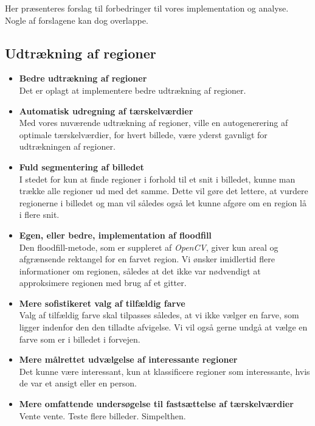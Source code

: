 {
{\sffamily Her præsenteres forslag til forbedringer til vores
implementation og analyse. Nogle af forslagene kan dog overlappe.
}

\subsection{Udtrækning af regioner}
\begin{itemize}
     \item \textbf{Bedre udtrækning af regioner}\\
        Det er oplagt at implementere bedre udtrækning af regioner.
     \item \textbf{Automatisk udregning af tærskelværdier}\\
        Med vores nuværende udtrækning af regioner, ville en
        autogenerering af optimale tærskelværdier, for hvert billede,
        være yderst gavnligt for udtrækningen af regioner.
    \item \textbf{Fuld segmentering af billedet}\\
        I stedet for kun at finde regioner i forhold til et snit i
        billedet, kunne man trække alle regioner ud med det samme. Dette
        vil gøre det lettere, at vurdere regionerne i billedet og man
        vil således også let kunne afgøre om en region lå i flere snit.
  \item \textbf{Egen, eller bedre, implementation af floodfill}\\
        Den floodfill-metode, som er suppleret af \emph{OpenCV}, giver
        kun areal og afgrænsende rektangel for en farvet region. Vi
        ønsker imidlertid flere informationer om regionen, således at
        det ikke var nødvendigt at approksimere regionen med brug af et
        gitter.
    \item \textbf{Mere sofistikeret valg af tilfældig farve}\\
        Valg af tilfældig farve skal tilpasses således, at vi ikke
        vælger en farve, som ligger indenfor den den tilladte afvigelse.
        Vi vil også gerne undgå at vælge en farve som er i billedet i
        forvejen.
    \item \textbf{Mere målrettet udvælgelse af interessante regioner}\\
        Det kunne være interessant, kun at klassificere regioner som
        interessante, hvis de var et ansigt eller en person.
    \item \textbf{Mere omfattende undersøgelse til fastsættelse af tærskelværdier}\\
        Vente vente. Teste flere billeder. Simpelthen.
\end{itemize}

}
